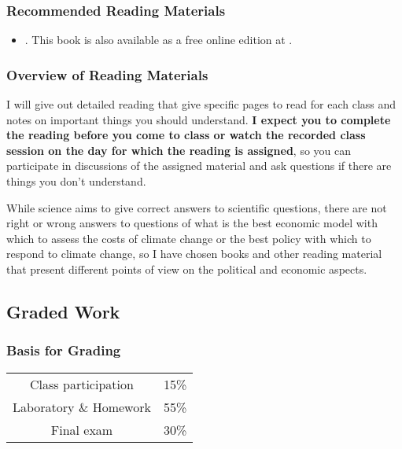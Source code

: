 \documentclass[11pt,twoside]{jgsyllabus}\usepackage[]{graphicx}\usepackage[]{color}
\begin{document}
\subsubsection[Recommended Reading]{Recommended Reading Materials}
\begin{itemize}
  \item \LongWickham. This book is also available as a free online edition at \WickhamURL.
\end{itemize}

\subsubsection{Overview of Reading Materials}
I will give out detailed reading that give specific pages to read for each
class and notes on important things you should understand.
\textbf{I expect you to complete the reading before you come to class or watch
  the recorded class session on the day for which the reading is assigned},
so you can participate in discussions of the assigned material and ask
questions if there are things you don't understand.

While science aims to give correct answers to scientific questions, there are
not right or wrong answers to questions of what is the best economic model with
which to assess the costs of climate change or the best policy with which
to respond to climate change, so I have chosen books and other reading material
that present different points of view on the political and economic aspects.
\iffalse

\subsubsection[Optional Reading]{Optional Supplementary Reading Materials}
See the ``External Links'' page on the course Brightspace site for links to optional
supplementary materials that you can read on-line or download free.
\fi

\subsection{Graded Work}
%
%
%
\subsubsection[Grading]{Basis for Grading}

\begin{center}
	\begin{tabular}[t]{cr}
		Class participation & 15\%\\
		Laboratory \& Homework & 55\%\\
		Final exam   & 30\%\\
	\end{tabular}
\end{center}
%
\end{document}
